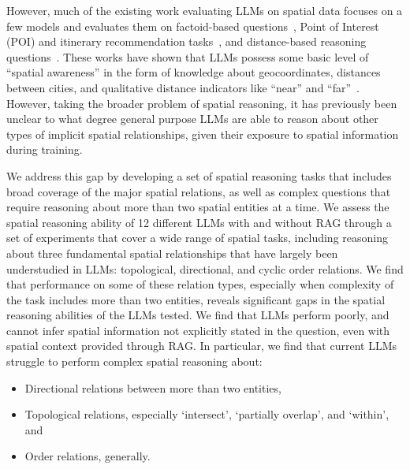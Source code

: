 However, much of the existing work evaluating LLMs on spatial data focuses on a few models and evaluates them on factoid-based questions~\cite{Qi2023,Roberts2023,Gupta2024,Yan2024}, Point of Interest (POI) and itinerary recommendation tasks~\cite{Schneider2025,Yu2025,Roberts2023,Xie2024,Gundawar2024,De2024}, and distance-based reasoning questions~\cite{Bhandari2023,Osullivan2024,Schneider2025b}.
These works have shown that LLMs possess some basic level of ``spatial awareness'' in the form of knowledge about geocoordinates, distances between cities, and qualitative distance indicators like ``near'' and ``far''~\cite{Bhandari2023,Qi2023,Osullivan2024}.
However, taking the broader problem of spatial reasoning, it has previously been unclear to what degree general purpose LLMs are able to reason about other types of implicit spatial relationships, given their exposure to spatial information during training.

We address this gap by developing a set of spatial reasoning tasks that includes broad coverage of the major spatial relations, as well as complex questions that require reasoning about more than two spatial entities at a time.
We assess the spatial reasoning ability of 12 different LLMs with and without RAG through a set of experiments that cover a wide range of spatial tasks, including reasoning about three fundamental spatial relationships that have largely been understudied in LLMs: topological, directional, and cyclic order relations.
We find that performance on some of these relation types, especially when complexity of the task includes more than two entities, reveals significant gaps in the spatial reasoning abilities of the LLMs tested. 
We find that LLMs perform poorly, and cannot infer spatial information not explicitly stated in the question, even with spatial context provided through RAG.
In particular, we find that current LLMs struggle to perform complex spatial reasoning about:

\begin{itemize}
    \item Directional relations between more than two entities, 
    \item Topological relations, especially `intersect', `partially overlap', and `within', and
    \item Order relations, generally.
\end{itemize}

